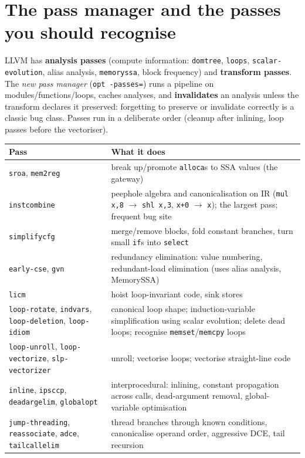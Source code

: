 \documentclass[10pt,a4paper,openany,oneside]{report}
\newcommand{\prio}[1]{\texorpdfstring{\ifcase#1\or{\color{gold}\ding{72}}\or{\color{gold}\ding{72}\ding{72}}\or{\color{gold}\ding{72}\ding{72}\ding{72}}\fi}{}}
\begin{document}
\section{The pass manager and the passes you should recognise \prio{3}}
\begin{mustbox}
LLVM has \textbf{analysis passes} (compute information: \texttt{domtree}, \texttt{loops}, \texttt{scalar-evolution}, alias analysis, \texttt{memoryssa}, block frequency) and \textbf{transform passes}. The \emph{new pass manager} (\texttt{opt -passes=}) runs a pipeline on modules/functions/loops, caches analyses, and \textbf{invalidates} an analysis unless the transform declares it preserved: forgetting to preserve or invalidate correctly is a classic bug class. Passes run in a deliberate order (cleanup after inlining, loop passes before the vectoriser).
\end{mustbox}
\begin{center}\small
\begin{xltabular}{\textwidth}{@{}L{3.2cm}Y@{}}
\toprule
\textbf{Pass} & \textbf{What it does}\\
\midrule\endhead
\texttt{sroa}, \texttt{mem2reg} & break up/promote \texttt{alloca}s to SSA values (the gateway)\\
\texttt{instcombine} & peephole algebra and canonicalisation on IR (\texttt{mul x,8} $\to$ \texttt{shl x,3}, \texttt{x+0} $\to$ \texttt{x}); the largest pass; frequent bug site\\
\texttt{simplifycfg} & merge/remove blocks, fold constant branches, turn small \texttt{if}s into \texttt{select}\\
\texttt{early-cse}, \texttt{gvn} & redundancy elimination: value numbering, redundant-load elimination (uses alias analysis, MemorySSA)\\
\texttt{licm} & hoist loop-invariant code, sink stores\\
\texttt{loop-rotate}, \texttt{indvars}, \texttt{loop-deletion}, \texttt{loop-idiom} & canonical loop shape; induction-variable simplification using scalar evolution; delete dead loops; recognise \texttt{memset}/\texttt{memcpy} loops\\
\texttt{loop-unroll}, \texttt{loop-vectorize}, \texttt{slp-vectorizer} & unroll; vectorise loops; vectorise straight-line code\\
\texttt{inline}, \texttt{ipsccp}, \texttt{deadargelim}, \texttt{globalopt} & interprocedural: inlining, constant propagation across calls, dead-argument removal, global-variable optimisation\\
\texttt{jump-threading}, \texttt{reassociate}, \texttt{adce}, \texttt{tailcallelim} & thread branches through known conditions, canonicalise operand order, aggressive DCE, tail recursion\\
\bottomrule
\end{xltabular}
\end{center}
\end{document}
